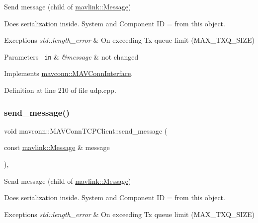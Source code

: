 Send message (child of \mbox{\hyperlink{structmavlink_1_1Message}{mavlink\+::\+Message}}) 

Does serialization inside. System and Component ID = from this object.


\begin{DoxyExceptions}{Exceptions}
{\em std\+::length\+\_\+error} & On exceeding Tx queue limit (M\+A\+X\+\_\+\+T\+X\+Q\+\_\+\+S\+I\+ZE) \\
\hline
\end{DoxyExceptions}

\begin{DoxyParams}[1]{Parameters}
\mbox{\texttt{ in}}  & {\em \&message} & not changed \\
\hline
\end{DoxyParams}


Implements \mbox{\hyperlink{group__mavconn_ga204ee5ba0dc31519b0ea7a9ac50d486c}{mavconn\+::\+M\+A\+V\+Conn\+Interface}}.



Definition at line 210 of file udp.\+cpp.

\mbox{\label{group__mavconn_ga1194ffc5b74604c5c432591751803f33}} 
\subsubsection{\texorpdfstring{send\_message()}{send\_message()}\hspace{0.1cm}{\footnotesize\ttfamily [6/10]}}
{\footnotesize\ttfamily void mavconn\+::\+M\+A\+V\+Conn\+T\+C\+P\+Client\+::send\+\_\+message (\begin{DoxyParamCaption}\item[{const \mbox{\hyperlink{structmavlink_1_1Message}{mavlink\+::\+Message}} \&}]{message }\end{DoxyParamCaption})\hspace{0.3cm}{\ttfamily [override]}, {\ttfamily [virtual]}}



Send message (child of \mbox{\hyperlink{structmavlink_1_1Message}{mavlink\+::\+Message}}) 

Does serialization inside. System and Component ID = from this object.


\begin{DoxyExceptions}{Exceptions}
{\em std\+::length\+\_\+error} & On exceeding Tx queue limit (M\+A\+X\+\_\+\+T\+X\+Q\+\_\+\+S\+I\+ZE) \\
\hline
\end{DoxyExceptions}

